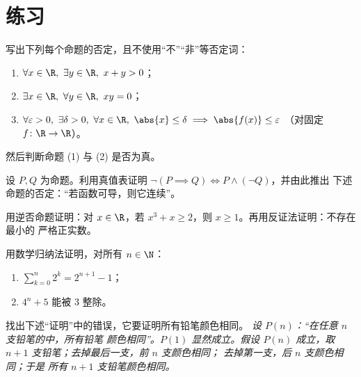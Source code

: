 \section{练习}

\begin{exercise}[$\star$]\label{exo:b1:logic:1}
写出下列每个命题的否定，且不使用“不”“非”等否定词：
\begin{enumerate}
  \item $\forall x \in \R,\ \exists y \in \R,\ x + y > 0$；
  \item $\exists x \in \R,\ \forall y \in \R,\ xy = 0$；
  \item $\forall \varepsilon > 0,\ \exists \delta > 0,\ \forall x \in
        \R,\ \abs{x} \leq \delta \implies \abs{f(x)} \leq \varepsilon$
        （对固定 $f \colon \R \to \R$）。
\end{enumerate}
然后判断命题 (1) 与 (2) 是否为真。
\end{exercise}

\begin{exercise}[$\star$]\label{exo:b1:logic:2}
设 $P, Q$ 为命题。利用真值表证明
$\lnot(P \implies Q) \iff P \land (\lnot Q)$，并由此推出
下述命题的否定：“若函数可导，则它连续”。
\end{exercise}

\begin{exercise}[$\star$]\label{exo:b1:logic:3}
用逆否命题证明：对 $x \in \R$，若 $x^3 + x \geq 2$，则
$x \geq 1$。再用反证法证明：不存在最小的
严格正实数。
\end{exercise}

\begin{exercise}[$\star$]\label{exo:b1:logic:4}
用数学归纳法证明，对所有 $n \in \N$：
\begin{enumerate}
  \item $\sum_{k=0}^{n} 2^k = 2^{n+1} - 1$；
  \item $4^n + 5$ 能被 $3$ 整除。
\end{enumerate}
\end{exercise}

\begin{exercise}[$\star$]\label{exo:b1:logic:5}
找出下述“证明”中的错误，它要证明所有铅笔颜色相同。
\emph{设 $P(n)$：“在任意 $n$ 支铅笔的中，所有铅笔
颜色相同”。$P(1)$ 显然成立。假设 $P(n)$ 成立，取 $n+1$
支铅笔；去掉最后一支，前 $n$ 支颜色相同；
去掉第一支，后 $n$ 支颜色相同；于是
所有 $n+1$ 支铅笔颜色相同。}
\end{exercise}

